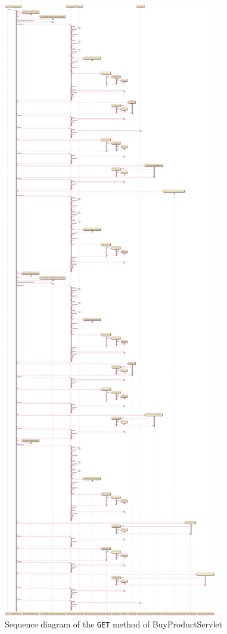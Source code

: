 \begin{figure}[H]
    \centering
    \includegraphics[width=\textwidth,height=0.95\textheight,keepaspectratio]{Schemas/BuyProductServlet_doGet.svg.pdf}
    \caption{Sequence diagram of the \texttt{GET} method of BuyProductServlet}
    \label{fig:BuyProductServlet_doGet}
\end{figure}

